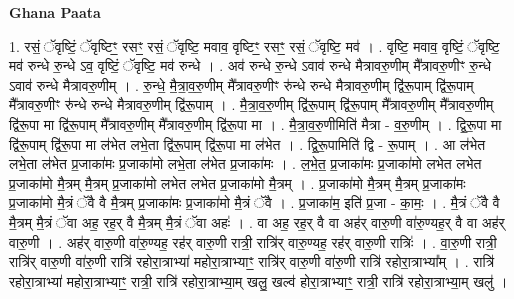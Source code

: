 \documentclass[17pt]{extarticle}
\begin{document}
\textbf{Ghana Paata } \newline

1. रसं॒ ॅवृष्टिं॒ ॅवृष्टिꣳ॒॒ रसꣳ॒॒ रसं॒ ॅवृष्टि॒ मवाव॒ वृष्टिꣳ॒॒ रसꣳ॒॒ रसं॒ ॅवृष्टि॒ मव॑ । . वृष्टि॒ मवाव॒ वृष्टिं॒ ॅवृष्टि॒ मव॑ रुन्धे रु॒न्धे ऽव॒ वृष्टिं॒ ॅवृष्टि॒ मव॑ रुन्धे । . अव॑ रुन्धे रु॒न्धे ऽवाव॑ रुन्धे मैत्रावरु॒णीम् मै᳚त्रावरु॒णीꣳ रु॒न्धे ऽवाव॑ रुन्धे मैत्रावरु॒णीम् । . रु॒न्धे॒ मै॒त्रा॒व॒रु॒णीम् मै᳚त्रावरु॒णीꣳ रु॑न्धे रुन्धे मैत्रावरु॒णीम् द्वि॑रू॒पाम् द्वि॑रू॒पाम् मै᳚त्रावरु॒णीꣳ रु॑न्धे रुन्धे मैत्रावरु॒णीम् द्वि॑रू॒पाम् । . मै॒त्रा॒व॒रु॒णीम् द्वि॑रू॒पाम् द्वि॑रू॒पाम् मै᳚त्रावरु॒णीम् मै᳚त्रावरु॒णीम् द्वि॑रू॒पा मा द्वि॑रू॒पाम् मै᳚त्रावरु॒णीम् मै᳚त्रावरु॒णीम् द्वि॑रू॒पा मा । . मै॒त्रा॒व॒रु॒णीमिति॑ मैत्रा - व॒रु॒णीम् । . द्वि॒रू॒पा मा द्वि॑रू॒पाम् द्वि॑रू॒पा मा ल॑भेत लभे॒ता द्वि॑रू॒पाम् द्वि॑रू॒पा मा ल॑भेत । . द्वि॒रू॒पामिति॑ द्वि - रू॒पाम् । . आ ल॑भेत लभे॒ता ल॑भेत प्र॒जाका॑मः प्र॒जाका॑मो लभे॒ता ल॑भेत प्र॒जाका॑मः । . ल॒भे॒त॒ प्र॒जाका॑मः प्र॒जाका॑मो लभेत लभेत प्र॒जाका॑मो मै॒त्रम् मै॒त्रम् प्र॒जाका॑मो लभेत लभेत प्र॒जाका॑मो मै॒त्रम् । . प्र॒जाका॑मो मै॒त्रम् मै॒त्रम् प्र॒जाका॑मः प्र॒जाका॑मो मै॒त्रं ॅवै वै मै॒त्रम् प्र॒जाका॑मः प्र॒जाका॑मो मै॒त्रं ॅवै । . प्र॒जाका॑म॒ इति॑ प्र॒जा - का॒मः॒ । . मै॒त्रं ॅवै वै मै॒त्रम् मै॒त्रं ॅवा अह॒ रह॒र् वै मै॒त्रम् मै॒त्रं ॅवा अहः॑ । . वा अह॒ रह॒र् वै वा अह॑र् वारु॒णी वा॑रु॒ण्यह॒र् वै वा अह॑र् वारु॒णी । . अह॑र् वारु॒णी वा॑रु॒ण्यह॒ रह॑र् वारु॒णी रात्री॒ रात्रि॑र् वारु॒ण्यह॒ रह॑र् वारु॒णी रात्रिः॑ । . वा॒रु॒णी रात्री॒ रात्रि॑र् वारु॒णी वा॑रु॒णी रात्रि॑ रहोरा॒त्राभ्या॑ महोरा॒त्राभ्याꣳ॒॒ रात्रि॑र् वारु॒णी वा॑रु॒णी रात्रि॑ रहोरा॒त्राभ्या᳚म् । . रात्रि॑ रहोरा॒त्राभ्या॑ महोरा॒त्राभ्याꣳ॒॒ रात्री॒ रात्रि॑ रहोरा॒त्राभ्या॒म् खलु॒ खल्व॑ होरा॒त्राभ्याꣳ॒॒ रात्री॒ रात्रि॑ रहोरा॒त्राभ्या॒म् खलु॑ । \newline
\end{document}
